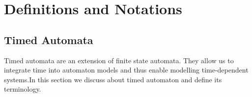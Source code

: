 \documentclass[12pt,letterpaper]{report}
\renewcommand{\thepage}{\roman{page}}
\begin{document}
\pagestyle{myheadings}



\tableofcontents
\pagebreak


\setcounter{page}{1}
\renewcommand{\thepage}{\arabic{page}}

\chapter{Definitions and Notations}
\section{Timed Automata}
Timed automata are an extension of finite state automata. They allow us to integrate time into automaton models and thus enable modelling time-dependent systems.In this section we discuss about timed automaton and define its terminology.
\end{document}
